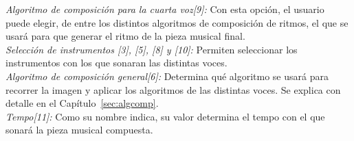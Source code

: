 		\noindent\textit{Algoritmo de composición para la cuarta voz[9]:} Con esta opción, el usuario puede elegir, de entre los distintos algoritmos de composición de ritmos, el que se usará para que generar el ritmo de la pieza musical final.\\
		
		\noindent\textit{Selección de instrumentos [3], [5], [8] y [10]:} Permiten seleccionar los instrumentos con los que sonaran las distintas voces.\\

		\noindent\textit{Algoritmo de composición general[6]:} Determina qué algoritmo se usará para recorrer la imagen y aplicar los algoritmos de las distintas voces. Se explica con detalle en el Capítulo~\ref{sec:algcomp}.\\

		\noindent\textit{Tempo[11]:} Como su nombre indica, su valor determina el tempo con el que sonará la pieza musical compuesta.\\
		
		